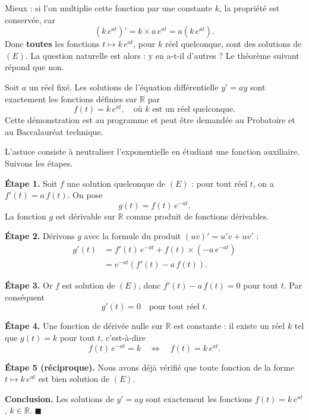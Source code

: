 \documentclass[11pt]{article}
\newcommand{\cle}[1]{{\popxbold\color{popdark}#1}}
\begin{document}
Mieux : si l'on multiplie cette fonction par une constante $k$, la propriété est conservée, car
\[ \left(k\,e^{at}\right)' = k \times a\,e^{at} = a\left(k\,e^{at}\right). \]
Donc \textbf{toutes} les fonctions $t \mapsto k\,e^{at}$, pour $k$ réel quelconque, sont des solutions de $(E)$. La question naturelle est alors : y en a-t-il d'autres ? Le théorème suivant répond que non.

\begin{propriete}
Soit $a$ un réel fixé. Les solutions de l'équation différentielle $y' = ay$ sont exactement les fonctions définies sur $\mathbb{R}$ par
\[ f(t) = k\,e^{at}, \quad \text{où } k \text{ est un réel quelconque.} \]
Cette démonstration est au programme et peut être demandée au Probatoire et au Baccalauréat technique.
\end{propriete}

\begin{experience}
L'astuce consiste à \og neutraliser \fg{} l'exponentielle en étudiant une fonction auxiliaire. Suivons les étapes.

\textbf{Étape 1.} Soit $f$ une solution quelconque de $(E)$ : pour tout réel $t$, on a $f'(t) = a\,f(t)$. On pose
\[ g(t) = f(t)\,e^{-at}. \]
La fonction $g$ est dérivable sur $\mathbb{R}$ comme produit de fonctions dérivables.

\textbf{Étape 2.} Dérivons $g$ avec la formule du produit $(uv)' = u'v + uv'$ :
\begin{align*}
g'(t) &= f'(t)\,e^{-at} + f(t)\times\left(-a\,e^{-at}\right) \\
&= e^{-at}\left(f'(t) - a\,f(t)\right).
\end{align*}

\textbf{Étape 3.} Or $f$ est solution de $(E)$, donc $f'(t) - a\,f(t) = 0$ pour tout $t$. Par conséquent
\[ g'(t) = 0 \quad \text{pour tout réel } t. \]

\textbf{Étape 4.} Une fonction de dérivée nulle sur $\mathbb{R}$ est \cle{constante} : il existe un réel $k$ tel que $g(t) = k$ pour tout $t$, c'est-à-dire
\[ f(t)\,e^{-at} = k \quad \Longleftrightarrow \quad f(t) = k\,e^{at}. \]

\textbf{Étape 5 (réciproque).} Nous avons déjà vérifié que toute fonction de la forme $t \mapsto k\,e^{at}$ est bien solution de $(E)$.

\textbf{Conclusion.} Les solutions de $y' = ay$ sont exactement les fonctions $f(t) = k\,e^{at}$, $k \in \mathbb{R}$. \hfill$\blacksquare$
\end{experience}
\end{document}
